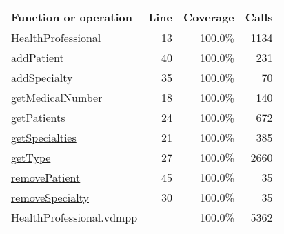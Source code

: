 \begin{longtable}{|l|r|r|r|}
\hline
Function or operation & Line & Coverage & Calls \\
\hline
\hline
\hyperref[HealthProfessional:13]{HealthProfessional} & 13&100.0\% & 1134 \\
\hline
\hyperref[addPatient:40]{addPatient} & 40&100.0\% & 231 \\
\hline
\hyperref[addSpecialty:35]{addSpecialty} & 35&100.0\% & 70 \\
\hline
\hyperref[getMedicalNumber:18]{getMedicalNumber} & 18&100.0\% & 140 \\
\hline
\hyperref[getPatients:24]{getPatients} & 24&100.0\% & 672 \\
\hline
\hyperref[getSpecialties:21]{getSpecialties} & 21&100.0\% & 385 \\
\hline
\hyperref[getType:27]{getType} & 27&100.0\% & 2660 \\
\hline
\hyperref[removePatient:45]{removePatient} & 45&100.0\% & 35 \\
\hline
\hyperref[removeSpecialty:30]{removeSpecialty} & 30&100.0\% & 35 \\
\hline
\hline
HealthProfessional.vdmpp & & 100.0\% & 5362 \\
\hline
\end{longtable}

